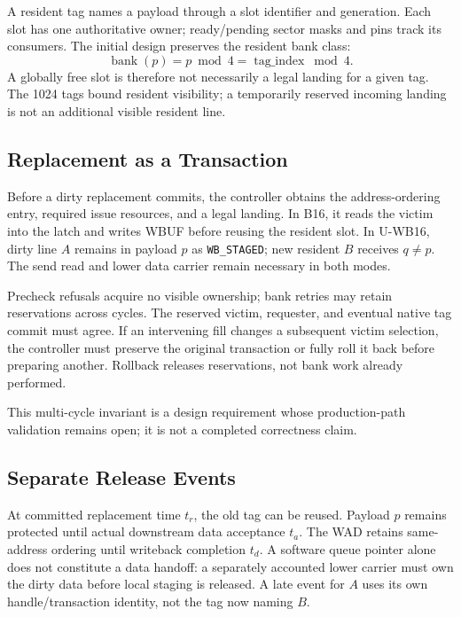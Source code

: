 \documentclass[conference,letterpaper]{IEEEtran}
\begin{document}
A resident tag names a payload through a slot identifier and generation. Each slot has one authoritative owner; ready/pending sector masks and pins track its consumers. The initial design preserves the resident bank class:
\begin{equation}
 \operatorname{bank}(p)=p\bmod4=\operatorname{tag\_index}\bmod4.
\label{eq:bank}
\end{equation}
A globally free slot is therefore not necessarily a legal landing for a given tag. The 1024 tags bound resident visibility; a temporarily reserved incoming landing is not an additional visible resident line.

\subsection{Replacement as a Transaction}
Before a dirty replacement commits, the controller obtains the address-ordering entry, required issue resources, and a legal landing. In B16, it reads the victim into the latch and writes WBUF before reusing the resident slot. In U-WB16, dirty line $A$ remains in payload $p$ as \texttt{WB\_STAGED}; new resident $B$ receives $q\ne p$. The send read and lower data carrier remain necessary in both modes.

Precheck refusals acquire no visible ownership; bank retries may retain reservations across cycles. The reserved victim, requester, and eventual native tag commit must agree. If an intervening fill changes a subsequent victim selection, the controller must preserve the original transaction or fully roll it back before preparing another. Rollback releases reservations, not bank work already performed.

This multi-cycle invariant is a design requirement whose production-path validation remains open; it is not a completed correctness claim.

\subsection{Separate Release Events}
At committed replacement time $t_r$, the old tag can be reused. Payload $p$ remains protected until actual downstream data acceptance $t_a$. The WAD retains same-address ordering until writeback completion $t_d$. A software queue pointer alone does not constitute a data handoff: a separately accounted lower carrier must own the dirty data before local staging is released. A late event for $A$ uses its own handle/transaction identity, not the tag now naming $B$.
\end{document}
